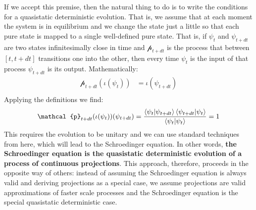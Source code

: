 \documentclass[11pt]{article}
\begin{document}
If we accept this premise, then the natural thing to do is to write the conditions for a quasistatic deterministic evolution. That is, we assume that at each moment the system is in equilibrium and we change the state just a little so that each pure state is mapped to a single well-defined pure state. That is, if $\psi_{t}$ and $\psi_{t+dt}$ are two states infinitesimally close in time and $\mathcal{p}_{t+dt}$ is the process that between $[t, t+dt]$ transitions one into the other, then every time $\psi_{t}$ is the input of that process $\psi_{t+dt}$ is its output. Mathematically:
\begin{equation}
\begin{aligned}
\mathcal{p}_{t+dt}(\iota(\psi_{t}))&=\iota(\psi_{t+dt}) \\
\end{aligned}
\end{equation}
Applying the definitions we find:
\begin{equation}
\begin{aligned}
\mathcal{p}_{t+dt}(\iota(\psi_{t}))(\psi_{t+dt}) &=
\frac{\braket{\psi_{t} | \psi_{t+dt}} \braket{\psi_{t+dt}|\psi_{t}}}{\braket{\psi_{t}|\psi_{t}}} = 1 \\
\end{aligned}
\end{equation}
This requires the evolution to be unitary and we can use standard techniques from here, which will lead to the Schroedinger equation. In other words, \textbf{the Schroedinger equation is the quasistatic deterministic evolution of a process of continuous projections}. This approach, therefore, proceeds in the opposite way of others: instead of assuming the Schroedinger equation is always valid and deriving projections as a special case, we assume projections are valid approximations of faster scale processes and the Schroedinger equation is the special quasistatic deterministic case.
\end{document}
